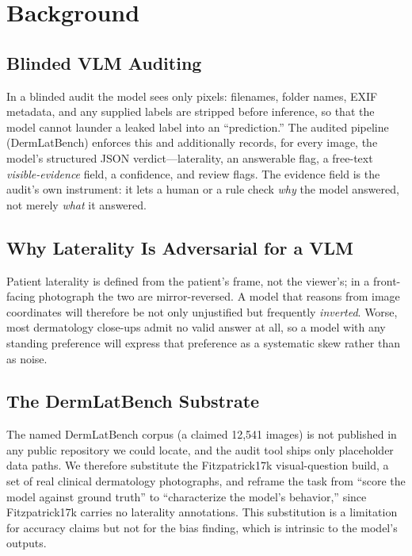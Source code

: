 \documentclass[conference]{IEEEtran}
\begin{document}
\section{Background}
\subsection{Blinded VLM Auditing}
In a blinded audit the model sees only pixels: filenames, folder names, EXIF metadata, and any supplied labels are stripped before inference, so that the model cannot launder a leaked label into an ``prediction.'' The audited pipeline (DermLatBench) enforces this and additionally records, for every image, the model's structured JSON verdict---laterality, an answerable flag, a free-text \emph{visible-evidence} field, a confidence, and review flags. The evidence field is the audit's own instrument: it lets a human or a rule check \emph{why} the model answered, not merely \emph{what} it answered.

\subsection{Why Laterality Is Adversarial for a VLM}
Patient laterality is defined from the patient's frame, not the viewer's; in a front-facing photograph the two are mirror-reversed. A model that reasons from image coordinates will therefore be not only unjustified but frequently \emph{inverted}. Worse, most dermatology close-ups admit no valid answer at all, so a model with any standing preference will express that preference as a systematic skew rather than as noise.

\subsection{The DermLatBench Substrate}
The named DermLatBench corpus (a claimed 12{,}541 images) is not published in any public repository we could locate, and the audit tool ships only placeholder data paths. We therefore substitute the Fitzpatrick17k visual-question build, a set of real clinical dermatology photographs, and reframe the task from ``score the model against ground truth'' to ``characterize the model's behavior,'' since Fitzpatrick17k carries no laterality annotations. This substitution is a limitation for accuracy claims but not for the bias finding, which is intrinsic to the model's outputs.
\end{document}
